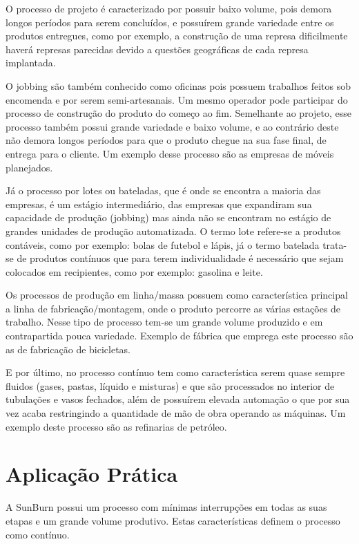 O processo de projeto é caracterizado por possuir baixo volume, pois demora longos períodos para serem concluídos, e possuírem grande variedade entre os produtos entregues, como por exemplo, a construção de uma represa dificilmente haverá represas parecidas devido a questões geográficas de cada represa implantada.
\par O jobbing são também conhecido como oficinas pois possuem trabalhos feitos sob encomenda e por serem semi-artesanais. Um mesmo operador pode participar do processo de construção do produto do começo ao fim. Semelhante ao projeto, esse processo também possui grande variedade e baixo volume, e ao contrário deste não demora longos períodos para que o produto chegue na sua fase final, de entrega para o cliente. Um exemplo desse processo são as empresas de móveis planejados.
\par Já o processo por lotes ou bateladas, que é onde se encontra a maioria das empresas, é um estágio intermediário, das empresas que expandiram sua capacidade de produção (jobbing) mas ainda não se encontram no estágio de grandes unidades de produção automatizada. O termo lote refere-se a produtos contáveis, como por exemplo: bolas de futebol e lápis, já o termo batelada trata-se de produtos contínuos que para terem individualidade é necessário que sejam colocados em recipientes, como por exemplo: gasolina e leite. 
\par Os processos de produção em linha/massa possuem como característica principal a linha de fabricação/montagem, onde o produto percorre as várias estações de trabalho. Nesse tipo de processo tem-se um grande volume produzido e em contrapartida pouca variedade. Exemplo de fábrica que emprega este processo são as de fabricação de bicicletas.
\par E por último, no processo contínuo tem como característica serem quase sempre fluidos (gases, pastas, líquido e misturas) e que são processados no interior de tubulações e vasos fechados, além de possuírem elevada automação o que por sua vez acaba restringindo a quantidade de mão de obra operando as máquinas. Um exemplo deste processo são as refinarias de petróleo.


\section{Aplicação Prática}
\label{sec:tipos_de_processo_de_producao_aplicacao}

A SunBurn possui um processo com mínimas interrupções em todas as suas etapas e um grande volume produtivo. Estas características definem o processo como contínuo.    


